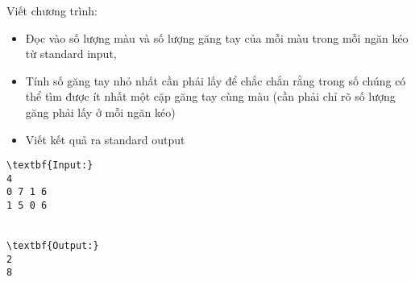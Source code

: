 Viết chương trình:  
\begin{itemize}
	\item     Đọc vào số lượng màu và số lượng găng tay của mỗi màu trong mỗi ngăn kéo từ standard input,   
	\item     Tính số găng tay nhỏ nhất cần phải lấy để chắc chắn rằng trong số chúng có thể tìm được ít nhất một cặp găng tay cùng màu (cần phải chỉ rõ số lượng găng phải lấy ở mỗi ngăn kéo)   
	\item     Viết kết quả ra standard output   
\end{itemize}
\begin{verbatim}
\textbf{Input:}
4
0 7 1 6
1 5 0 6


\textbf{Output:}
2
8

\end{verbatim}